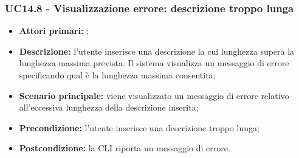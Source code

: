 \subsubsection{UC14.8 - Visualizzazione errore: descrizione troppo lunga}
\begin{itemize}
	\item \textbf{Attori primari:} \us{};
	\item \textbf{Descrizione:} l’utente inserisce una descrizione la cui lunghezza supera la lunghezza massima prevista. Il sistema visualizza un messaggio di errore specificando qual è la lunghezza massima consentita;
	\item \textbf{Scenario principale:} viene visualizzato un messaggio di errore relativo all’eccessiva lunghezza della descrizione inserita; 
	\item \textbf{Precondizione:} l'utente inserisce una descrizione troppo lunga;
	\item \textbf{Postcondizione:} la CLI riporta un messaggio di errore.
\end{itemize}